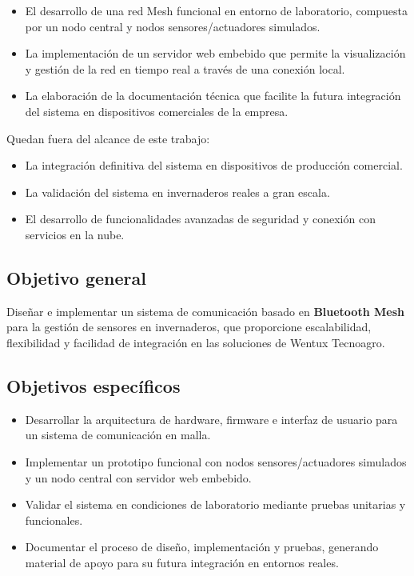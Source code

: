 \begin{itemize}
    \item El desarrollo de una red Mesh funcional en entorno de laboratorio, compuesta por un nodo central y nodos sensores/actuadores simulados.
    \item La implementación de un servidor web embebido que permite la visualización y gestión de la red en tiempo real a través de una conexión local.
    \item La elaboración de la documentación técnica que facilite la futura integración del sistema en dispositivos comerciales de la empresa.
\end{itemize}

Quedan fuera del alcance de este trabajo:
\begin{itemize}
    \item La integración definitiva del sistema en dispositivos de producción comercial.
    \item La validación del sistema en invernaderos reales a gran escala.
    \item El desarrollo de funcionalidades avanzadas de seguridad y conexión con servicios en la nube.
\end{itemize}

\subsection*{Objetivo general}
Diseñar e implementar un sistema de comunicación basado en \textbf{Bluetooth Mesh} para la gestión de sensores en invernaderos, que proporcione escalabilidad, flexibilidad y facilidad de integración en las soluciones de Wentux Tecnoagro.

\subsection*{Objetivos específicos}
\begin{itemize}
    \item Desarrollar la arquitectura de hardware, firmware e interfaz de usuario para un sistema de comunicación en malla.
    \item Implementar un prototipo funcional con nodos sensores/actuadores simulados y un nodo central con servidor web embebido.
    \item Validar el sistema en condiciones de laboratorio mediante pruebas unitarias y funcionales.
    \item Documentar el proceso de diseño, implementación y pruebas, generando material de apoyo para su futura integración en entornos reales.
\end{itemize}
